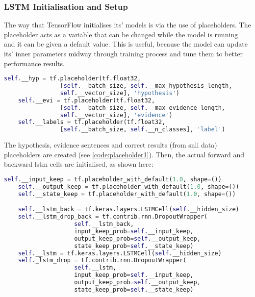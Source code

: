         \subsubsection{LSTM Initialisation and Setup}
            
            The way that TensorFlow initialises its' models is via the use of placeholders. The placeholder acts as a variable that can be changed while the model is running and it can be given a default value. This is useful, because the model can update its' inner parameters midway through training process and tune them to better performance results.
            
            \begin{lstlisting}[language=Python, caption=Placeholders for Sentences and Results, label=code:placeholder1]
    self.__hyp = tf.placeholder(tf.float32, 
                [self.__batch_size, self.__max_hypothesis_length, 
                self.__vector_size], 'hypothesis')
    self.__evi = tf.placeholder(tf.float32, 
                [self.__batch_size, self.__max_evidence_length, 
                self.__vector_size], 'evidence')
    self.__labels = tf.placeholder(tf.float32, 
                [self.__batch_size, self.__n_classes], 'label')
            \end{lstlisting}
            \FloatBarrier
            
            The hypothesis, evidence sentences and correct results (from \gls{snli} data) placeholders are created (see \cref{code:placeholder1}). Then, the actual forward and backward \gls{lstm} cells are initialised, as shown here:
            
            \begin{lstlisting}[language=Python, caption=Initialisation of LSTM, label=code:placeholder2]
    self.__input_keep = tf.placeholder_with_default(1.0, shape=())
    self.__output_keep = tf.placeholder_with_default(1.0, shape=())
    self.__state_keep = tf.placeholder_with_default(1.0, shape=())

    self.__lstm_back = tf.keras.layers.LSTMCell(self.__hidden_size)
    self.__lstm_drop_back = tf.contrib.rnn.DropoutWrapper(
                    self.__lstm_back,
                    input_keep_prob=self.__input_keep,
                    output_keep_prob=self.__output_keep,
                    state_keep_prob=self.__state_keep)
    self.__lstm = tf.keras.layers.LSTMCell(self.__hidden_size)
    self._lstm_drop = tf.contrib.rnn.DropoutWrapper(
                    self.__lstm,
                    input_keep_prob=self.__input_keep,
                    output_keep_prob=self.__output_keep,
                    state_keep_prob=self.__state_keep)
            \end{lstlisting}
            \FloatBarrier
            
